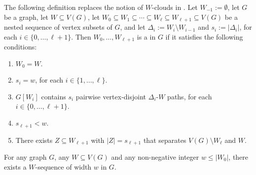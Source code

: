 \documentclass{patmorin}
\begin{document}
The following definition replaces the notion of $W$-clouds in \cite{dvorak.norin:treewidth}.
Let $W_{-1}:=\emptyset$, let $G$ be a graph, let $W\subseteq V(G)$, let $W_0\subseteq W_1\subseteq\cdots\subseteq W_{\ell}\subseteq W_{\ell+1}\subseteq V(G)$ be a nested sequence of vertex subsets of $G$, and let $\Delta_i:=W_{i}\setminus W_{i-1}$ and $s_i:=|\Delta_i|$, for each $i\in\{0,\ldots,\ell+1\}$.  Then $W_0,\ldots,W_{\ell+1}$ is a  in $G$ if it satisfies the following conditions:
\begin{enumerate}[nosep,nolistsep,label=\rm(\alph*),ref=(\alph*)]
  \item $W_0=W$.\label{w_starts}
  \item $s_i=w$, for each $i\in\{1,\ldots,\ell\}$.\label{uniform_size}
  \item $G[W_i]$ contains $s_i$  pairwise vertex-disjoint $\Delta_i$-$W$ paths, for each $i\in\{0,\ldots,\ell+1\}$.\label{linked}
  \item $s_{\ell+1}< w$.\label{remainder}  
  \item There exists $Z\subseteq W_{\ell+1}$ with $|Z|=s_{\ell+1}$ that separates $V(G)\setminus W_{\ell}$ and $W$. \label{separated}
\end{enumerate}

\begin{lem}\label{w_sequence}
  For any graph $G$, any $W\subseteq V(G)$ and any non-negative integer $w\le |W_0|$, there exists a $W$-sequence of width $w$ in $G$.
\end{lem}
\end{document}
